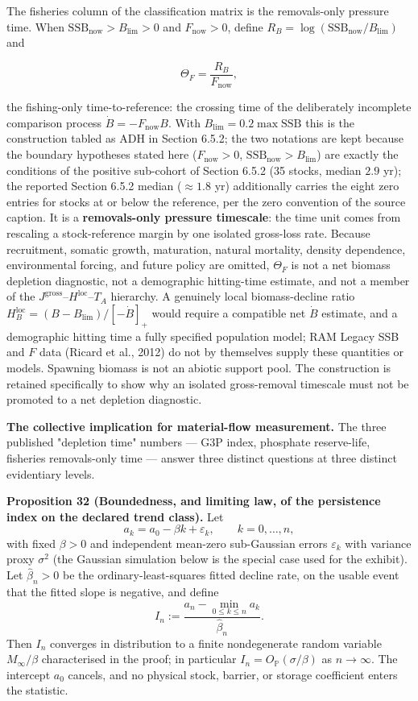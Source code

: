 \documentclass[11pt]{article}
\begin{document}
The fisheries column of the classification matrix is the removals-only pressure time. When \(\mathrm{SSB}_{\mathrm{now}} > B_{\lim} > 0\) and \(F_{\mathrm{now}} > 0\), define \(R_B =\allowbreak{} \log(\mathrm{SSB}_{\mathrm{now}}/B_{\lim})\) and 

$$\Theta_F = \frac{R_B}{F_{\mathrm{now}}},$$

 the fishing-only time-to-reference: the crossing time of the deliberately incomplete comparison process \(\dot B = -F_{\mathrm{now}}B\). With \(B_{\lim} =\allowbreak{} 0.2 \max \mathrm{SSB}\) this is the construction tabled as ADH in Section 6.5.2; the two notations are kept because the boundary hypotheses stated here (\(F_{\mathrm{now}} > 0\), \(\mathrm{SSB}_{\mathrm{now}} > B_{\lim}\)) are exactly the conditions of the positive sub-cohort of Section 6.5.2 (35 stocks, median \(2.9\) yr); the reported Section 6.5.2 median (\(\approx 1.8\) yr) additionally carries the eight zero entries for stocks at or below the reference, per the zero convention of the source caption. It is a \textbf{removals-only pressure timescale}: the time unit comes from rescaling a stock-reference margin by one isolated gross-loss rate. Because recruitment, somatic growth, maturation, natural mortality, density dependence, environmental forcing, and future policy are omitted, \(\Theta_F\) is not a net biomass depletion diagnostic, not a demographic hitting-time estimate, and not a member of the \(J^{\mathrm{gross}}\)--\(H^{\mathrm{loc}}\)--\(T_A\) hierarchy. A genuinely local biomass-decline ratio \(H_B^{\mathrm{loc}} =\allowbreak{} (B - B_{\lim})/[-\dot B]_+\allowbreak{}\) would require a compatible net \(\dot B\) estimate, and a demographic hitting time a fully specified population model; RAM Legacy SSB and \(F\) data (Ricard et al., 2012) do not by themselves supply these quantities or models. Spawning biomass is not an abiotic support pool. The construction is retained specifically to show why an isolated gross-removal timescale must not be promoted to a net depletion diagnostic.

\textbf{The collective implication for material-flow measurement.} The three published "depletion time" numbers --- G3P index, phosphate reserve-life, fisheries removals-only time --- answer three distinct questions at three distinct evidentiary levels.

\textbf{Proposition 32 (Boundedness, and limiting law, of the persistence index on the declared trend class).} Let
$$a_k=a_0-\beta k+\varepsilon_k,\qquad k=0,\dots,n,$$
with fixed \(\beta>0\) and independent mean-zero sub-Gaussian errors \(\varepsilon_k\) with variance proxy \(\sigma^2\) (the Gaussian simulation below is the special case used for the exhibit). Let \(\widehat\beta_n>0\) be the ordinary-least-squares fitted decline rate, on the usable event that the fitted slope is negative, and define
$$I_n:=\frac{a_n-\min_{0\le k\le n}a_k}{\widehat\beta_n}.$$
Then \(I_n\) converges in distribution to a finite nondegenerate random variable \(M_\infty/\beta\) characterised in the proof; in particular \(I_n=O_{\mathbb P}(\sigma/\beta)\) as \(n\to\infty\). The intercept \(a_0\) cancels, and no physical stock, barrier, or storage coefficient enters the statistic.
\end{document}

